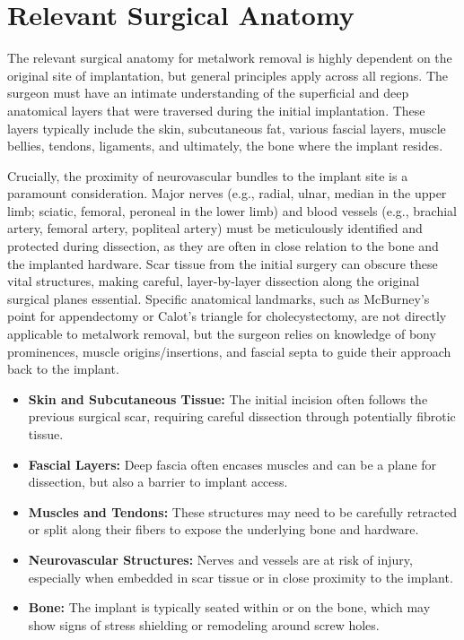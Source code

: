 \section*{Relevant Surgical Anatomy}
The relevant surgical anatomy for metalwork removal is highly dependent on the original site of implantation, but general principles apply across all regions. The surgeon must have an intimate understanding of the superficial and deep anatomical layers that were traversed during the initial implantation. These layers typically include the skin, subcutaneous fat, various fascial layers, muscle bellies, tendons, ligaments, and ultimately, the bone where the implant resides.

Crucially, the proximity of neurovascular bundles to the implant site is a paramount consideration. Major nerves (e.g., radial, ulnar, median in the upper limb; sciatic, femoral, peroneal in the lower limb) and blood vessels (e.g., brachial artery, femoral artery, popliteal artery) must be meticulously identified and protected during dissection, as they are often in close relation to the bone and the implanted hardware. Scar tissue from the initial surgery can obscure these vital structures, making careful, layer-by-layer dissection along the original surgical planes essential. Specific anatomical landmarks, such as McBurney's point for appendectomy or Calot's triangle for cholecystectomy, are not directly applicable to metalwork removal, but the surgeon relies on knowledge of bony prominences, muscle origins/insertions, and fascial septa to guide their approach back to the implant.

\begin{itemize}
  \item \textbf{Skin and Subcutaneous Tissue:} The initial incision often follows the previous surgical scar, requiring careful dissection through potentially fibrotic tissue.
  \item \textbf{Fascial Layers:} Deep fascia often encases muscles and can be a plane for dissection, but also a barrier to implant access.
  \item \textbf{Muscles and Tendons:} These structures may need to be carefully retracted or split along their fibers to expose the underlying bone and hardware.
  \item \textbf{Neurovascular Structures:} Nerves and vessels are at risk of injury, especially when embedded in scar tissue or in close proximity to the implant.
  \item \textbf{Bone:} The implant is typically seated within or on the bone, which may show signs of stress shielding or remodeling around screw holes.
\end{itemize}

